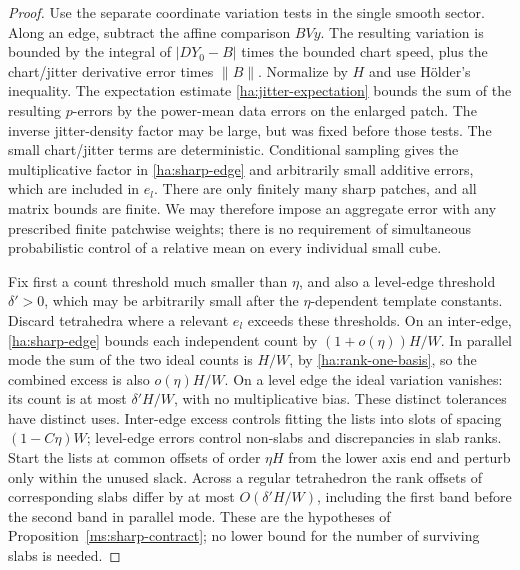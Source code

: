\begin{proof}
Use the separate coordinate variation tests in the single smooth
sector.  Along an edge, subtract the affine comparison $BVy$.
The resulting variation is bounded by the integral of
$|DY_0-B|$ times the bounded chart speed, plus the chart/jitter
derivative error times $\|B\|$.  Normalize by $H$ and use
H\"older's inequality.  The expectation estimate
\eqref{ha:jitter-expectation} bounds the sum of the resulting
$p$-errors by the power-mean data errors on the enlarged patch.
The inverse jitter-density factor may be large, but was fixed before
those tests.  The small chart/jitter terms are deterministic.
Conditional sampling gives the multiplicative factor in
\eqref{ha:sharp-edge} and arbitrarily small additive errors, which
are included in $e_l$.  There are only finitely many sharp patches,
and all matrix bounds are finite.  We may therefore impose an
aggregate error with any prescribed finite patchwise weights;
there is no requirement of simultaneous probabilistic control of a
relative mean on every individual small cube.

Fix first a count threshold much smaller than $\eta$, and also a
level-edge threshold $\delta'>0$, which may be arbitrarily small
after the $\eta$-dependent template constants.  Discard tetrahedra
where a relevant $e_l$ exceeds these thresholds.  On an inter-edge,
\eqref{ha:sharp-edge} bounds each independent count by
$(1+o(\eta))H/W$.  In parallel mode the sum of the two ideal counts
is $H/W$, by \eqref{ha:rank-one-basis}, so the combined excess is
also $o(\eta)H/W$.  On a level edge the ideal variation vanishes:
its count is at most $\delta'H/W$, with no multiplicative bias.
These distinct tolerances have distinct uses.  Inter-edge excess
controls fitting the lists into slots of spacing $(1-C\eta)W$;
level-edge errors control non-slabs and discrepancies in slab ranks.
Start the lists at common offsets of order $\eta H$ from the lower
axis end and perturb only within the unused slack.  Across a
regular tetrahedron the rank offsets of corresponding slabs differ
by at most $O(\delta'H/W)$, including the first band before the
second band in parallel mode.  These are the hypotheses of
Proposition~\ref{ms:sharp-contract}; no lower bound for the number
of surviving slabs is needed.


\end{proof}
